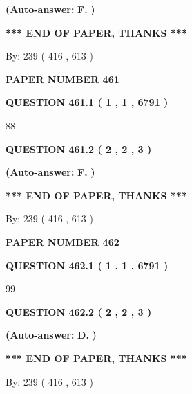 \documentclass[12pt]{article}
\begin{document}
 
{\textbf{(Auto-answer:}}
{\textbf{\large{
F.}}}
{\textbf{)}}
 
 
   
   
   
   
\vspace{1.0in} 
{\textbf{\large{ *** END OF PAPER, THANKS *** }}} 
   
   
\hspace{1.0in} By: 
 239 ( 416 ,  613 )
   
   
   
   
\newpage 
\setcounter{page}{ 
   461001 } 
   
   
 {\textbf{ \Large{ PAPER NUMBER  461  }}}
   
   
   
   
  
  
{\textbf{\large{QUESTION
461.1 
 ( 1 , 1 , 6791 )
}}}

88
  
  
{\textbf{\large{QUESTION
461.2 
 ( 2 , 2 , 3 )
}}}
 
 
{\textbf{(Auto-answer:}}
{\textbf{\large{
F.}}}
{\textbf{)}}
 
 
   
   
   
   
\vspace{1.0in} 
{\textbf{\large{ *** END OF PAPER, THANKS *** }}} 
   
   
\hspace{1.0in} By: 
 239 ( 416 ,  613 )
   
   
   
   
\newpage 
\setcounter{page}{ 
   462001 } 
   
   
 {\textbf{ \Large{ PAPER NUMBER  462  }}}
   
   
   
   
  
  
{\textbf{\large{QUESTION
462.1 
 ( 1 , 1 , 6791 )
}}}

99
  
  
{\textbf{\large{QUESTION
462.2 
 ( 2 , 2 , 3 )
}}}
 
 
{\textbf{(Auto-answer:}}
{\textbf{\large{
D.}}}
{\textbf{)}}
 
 
   
   
   
   
\vspace{1.0in} 
{\textbf{\large{ *** END OF PAPER, THANKS *** }}} 
   
   
\hspace{1.0in} By: 
 239 ( 416 ,  613 )
   
   
   
\end{document}
